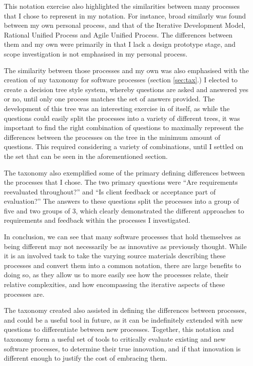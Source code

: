 \documentclass[a4paper,10pt]{article}
\begin{document}
This notation exercise also highlighted the similarities between many processes that I chose to represent in my notation. For instance, broad similarly was found between my own personal process, and that of the Iterative Development Model, Rational Unified Process and Agile Unified Process. The differences between them and my own were primarily in that I lack a design prototype stage, and scope investigation is not emphasised in my  personal process.

The similarity between those processes and my own was also emphasised with the creation of my taxonomy for software processes (section \ref{sec:tax}.) I elected to create a decision tree style system, whereby questions are asked and answered yes or no, until only one process matches the set of answers provided. The development of this tree was an interesting exercise in of itself, as while the questions could easily split the processes into a variety of different trees, it was important to find the right combination of questions to maximally represent the differences between the processes on the tree in the minimum amount of questions. This required considering a variety of combinations, until I settled on the set that can be seen in the aforementioned section. 

The taxonomy also exemplified some of the primary defining differences between the processes that I chose. The two primary questions were ``Are requirements reevaluated throughout?'' and ``Is client feedback or acceptance part of evaluation?'' The answers to these questions split the processes into a group of five and two groups of 3, which clearly demonstrated the different approaches to requirements and feedback within the processes I investigated.

In conclusion, we can see that many software processes that hold themselves as being different may not necessarily be as innovative as previously thought. While it is an involved task to take the varying source materials describing these processes and convert them into a common notation, there are large benefits to doing so, as they allow us to more easily see how the processes relate, their relative complexities, and how encompassing the iterative aspects of these processes are. 

The taxonomy created also assisted in defining the differences between processes, and could be a useful tool in future, as it can be indefinitely extended with new questions to differentiate between new processes. Together, this notation and taxonomy form a useful set of tools to critically evaluate existing and new software processes, to determine their true innovation, and if that innovation is different enough to justify the cost of embracing them.
\end{document}
